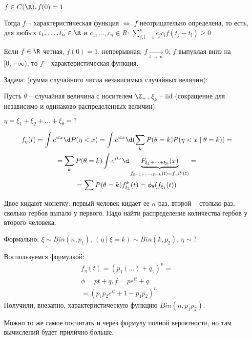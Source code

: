 \begin{theorem}
$f \in C(\R), f(0) = 1$

Тогда $f$ -- характеристическая функция $\Leftrightarrow$ $f$ неотрицательно определена, то есть, для любых $t_1, \dots, t_n \in \R$ и $c_1, \dots, c_n \in R$: 
$\sum\limits_{j, l=1}^n c_j \bar c_l f(t_j - t_l) \geq 0$
\end{theorem}
\begin{theorem}[Пойа]
Если $f \in \R$ четная, $f(0) = 1$, непрерывная, $f \xrightarrow[t \to \infty]{} 0$, $f$ выпуклая вниз на $[0, +\infty)$, то $f$ -- характеристическая функция.
\end{theorem}

Задача: (сумма случайного числа независимых случайных величин):

Пусть $\theta$ -- случайная величина с носителем $\Z_+$, $\xi_k$ -- iid (сокращение для независимо и одинаково распределенных величин).

$\eta = \xi_1 + \xi_2 + \dots + \xi_\theta = ?$

\begin{gather*}
f_\eta(t) = \int e^{itx}\d P(\eta < x) = \int e^{itx} \d (\sum\limits_k P(\theta = k) P(\eta < x \mid \theta = k)) =\\
= \sum\limits_k P(\theta =  k) \int e^{itx} \d \underbrace{F_{\xi_1 + \dots +  \xi_k}(x)}_{f_{\xi+1 + \dots + \xi+k}(t) = f_xi_1^k(t)} = \\
= \sum P(\theta = k) f_{\xi_1}^k(t) = \phi_\theta(f_{\xi_1}(t))
\end{gather*}

\begin{exmp}
Двое кидают монетку: первый человек кидает ее $n$ раз, второй -- столько раз, сколько гербов выпало у первого. 
Надо найти распределение количества гербов у второго человека.

Формально: $\xi \sim Bin(n, p_1)$, $(\eta \mid \xi = k) \sim Bin(k, p_2)$, $\eta \sim ?$

Воспользуемся формулкой:
\begin{gather*}
f_\eta(t)  = (p_1( \dots ) + q_1)^n = \\
\phi = pt + q, f = pe^{it} + q \\
= (p_1p_2e^{it} + 1-p_1p_2)^n
\end{gather*}
Получили, внезапно, характеристическую функцию $Bin(n, p_1p_2)$.

Можно то же самое посчитать и через формулу полной вероятности, но там вычислений будет прилично больше.
\end{exmp}

